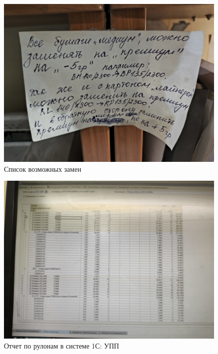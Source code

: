 \newpage
\begin{figure}
\begin{center}
 \includegraphics[height=0.4\textheight, keepaspectratio]{Pics/V примечания по заменам сырья.jpg}
\end{center}
 \caption{Список возможных замен}
 \label{pic:V примечания по заменам сырья}
\end{figure}
%
\begin{figure}
\begin{center}
 \includegraphics[height=0.4\textheight, keepaspectratio]{Pics/V оценка наличия сырья.jpg}
\end{center}
 \caption{Отчет по рулонам в системе 1С: УПП}
 \label{pic:V оценка наличия сырья}
\end{figure}


